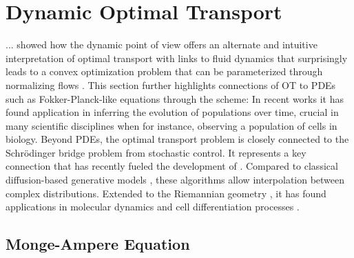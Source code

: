 \section{Dynamic Optimal Transport} \label{sec:background_ot_dynamic}

...
\citet*{benamou2000computational} showed how the dynamic point of view offers an alternate and intuitive interpretation of optimal transport with links to fluid dynamics that surprisingly leads to a convex optimization problem that can be parameterized through normalizing flows \citep{tong2020trajectorynet}.
This section further highlights connections of OT to PDEs such as Fokker-Planck-like equations through the \citeauthor*{jordan1998variational} scheme: In recent works \citep{bunne2022proximal, alvarez2021optimizing, mokrov2021large, benamou2016augmented} 
it has found application in inferring the evolution of populations over time, crucial in many scientific disciplines when for instance, observing a population of cells in biology.
Beyond PDEs, the optimal transport problem is closely connected to the Schr\"odinger bridge problem from stochastic control. It represents a key connection that has recently fueled the development of  \citep{de2021diffusion, chen2021stochastic, bunne2022recovering, liu2022deep}. Compared to classical diffusion-based generative models \citep{daniels2021score, song2020score}, these algorithms allow interpolation between complex distributions. Extended to the Riemannian geometry \citep{thornton2022riemannian, de2022riemannian}, it has found applications in molecular dynamics \citep{holdijk2022path} and cell differentiation processes \citep{tong2023conditional, bunne2022recovering}.



\subsection{Monge-Ampere Equation} \label{sec:background_monge_ampere}


